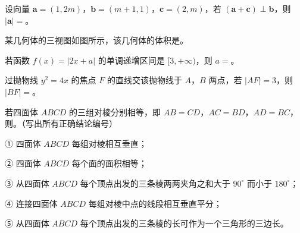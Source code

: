 \begin{question}
设向量 $\boldsymbol a=(1,2m)$，$\boldsymbol b=(m+1,1)$，$\boldsymbol c=(2,m)$，若 $(\boldsymbol a+\boldsymbol c)\perp\boldsymbol b$，则 $|\boldsymbol a|=$\gkblank{}。

\Needspace{0.4\textheight}
\end{question}
\begin{question}
某几何体的三视图如图所示，该几何体的体积是\gkblank{}。
\nopagebreak[4]
\begin{center}\end{center}
\nopagebreak[4]
\end{question}
\begin{question}
若函数 $f(x)=|2x+a|$ 的单调递增区间是 $[3,+\infty)$，则 $a=$\gkblank{}。

\end{question}
\begin{question}
过抛物线 $y^2=4x$ 的焦点 $F$ 的直线交该抛物线于 $A$，$B$ 两点，若 $|AF|=3$，则 $|BF|=$\gkblank{}。

\end{question}
\begin{question}
若四面体 $ABCD$ 的三组对棱分别相等，即 $AB=CD$，$AC=BD$，$AD=BC$，则\gkblank{}。（写出所有正确结论编号）

① 四面体 $ABCD$ 每组对棱相互垂直；

② 四面体 $ABCD$ 每个面的面积相等；

③ 从四面体 $ABCD$ 每个顶点出发的三条棱两两夹角之和大于 $90^\circ$ 而小于 $180^\circ$；

④ 连接四面体 $ABCD$ 每组对棱中点的线段相互垂直平分；

⑤ 从四面体 $ABCD$ 每个顶点出发的三条棱的长可作为一个三角形的三边长。

\end{question}

